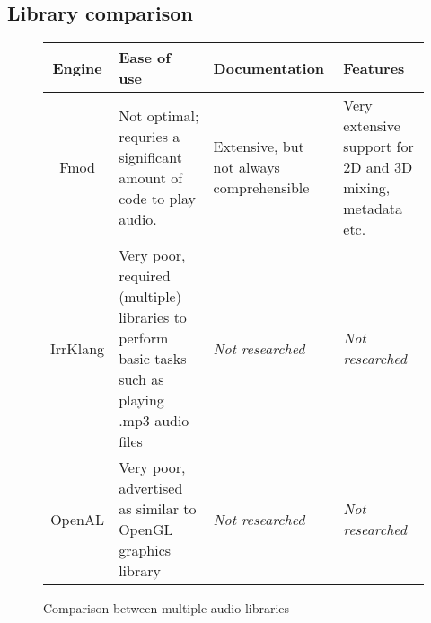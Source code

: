 \subsection{Library comparison}
\begin{figure}[h!]
    \centering
    \begin{tabularx}{\textwidth}{|c|X|X|X|} \hline
        \textbf{Engine} & \textbf{Ease of use}                                                                             & \textbf{Documentation}                   & \textbf{Features}                                          \\ \hline
        Fmod            & Not optimal; requries a significant amount of code to play audio.                                & Extensive, but not always comprehensible & Very extensive support for 2D and 3D mixing, metadata etc. \\ \hline
        IrrKlang        & Very poor, required (multiple) libraries to perform basic tasks such as playing .mp3 audio files & \textit{Not researched}                  & \textit{Not researched}                                    \\ \hline
        OpenAL          & Very poor, advertised as similar to OpenGL graphics library                                      & \textit{Not researched}                  & \textit{Not researched}                                    \\ \hline
    \end{tabularx}
    \caption{Comparison between multiple audio libraries}
    \label{fig:audioLibComparison}
\end{figure}
